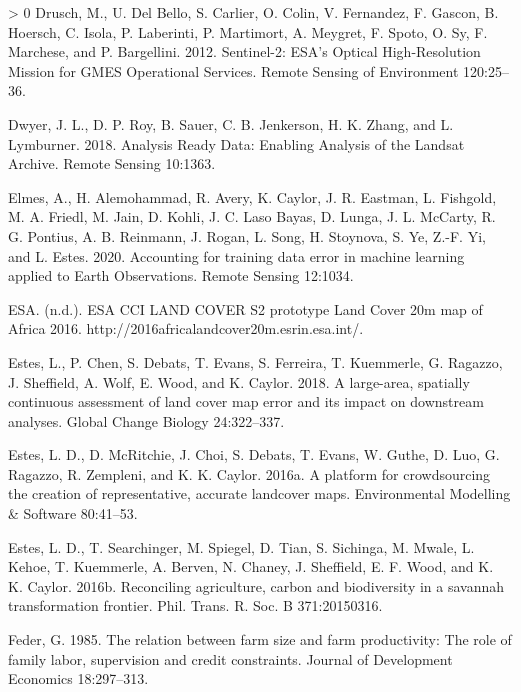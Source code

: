 \documentclass[11pt,a4paper]{article}
\newlength{\cslhangindent}
\newenvironment{CSLReferences}[3] %
 {%
  \setlength{\parindent}{0pt}
  \ifodd #1 \everypar{\setlength{\hangindent}{\cslhangindent}}\ignorespaces\fi
  \ifnum #2 > 0
  \setlength{\parskip}{#2\baselineskip}
  \fi
 }%
 {}
\begin{document}
\begin{CSLReferences}{1}{0}
\leavevmode\hypertarget{ref-DruschSentinel2ESAOptical2012}{}%
Drusch, M., U. Del Bello, S. Carlier, O. Colin, V. Fernandez, F. Gascon,
B. Hoersch, C. Isola, P. Laberinti, P. Martimort, A. Meygret, F. Spoto,
O. Sy, F. Marchese, and P. Bargellini. 2012. Sentinel-2: {ESA}'s
{Optical High}-{Resolution Mission} for {GMES Operational Services}.
Remote Sensing of Environment 120:25--36.

\leavevmode\hypertarget{ref-DwyerAnalysisReadyData2018}{}%
Dwyer, J. L., D. P. Roy, B. Sauer, C. B. Jenkerson, H. K. Zhang, and L.
Lymburner. 2018. Analysis {Ready Data}: {Enabling Analysis} of the
{Landsat Archive}. Remote Sensing 10:1363.

\leavevmode\hypertarget{ref-ElmesAccountingtrainingdata2020}{}%
Elmes, A., H. Alemohammad, R. Avery, K. Caylor, J. R. Eastman, L.
Fishgold, M. A. Friedl, M. Jain, D. Kohli, J. C. Laso Bayas, D. Lunga,
J. L. McCarty, R. G. Pontius, A. B. Reinmann, J. Rogan, L. Song, H.
Stoynova, S. Ye, Z.-F. Yi, and L. Estes. 2020. Accounting for training
data error in machine learning applied to {Earth Observations}. Remote
Sensing 12:1034.

\leavevmode\hypertarget{ref-ESAESACCILAND}{}%
ESA. (n.d.). {ESA CCI LAND COVER} {} {S2} prototype {Land Cover} 20m map
of {Africa} 2016. http://2016africalandcover20m.esrin.esa.int/.

\leavevmode\hypertarget{ref-Esteslargeareaspatiallycontinuous2018}{}%
Estes, L., P. Chen, S. Debats, T. Evans, S. Ferreira, T. Kuemmerle, G.
Ragazzo, J. Sheffield, A. Wolf, E. Wood, and K. Caylor. 2018. A
large-area, spatially continuous assessment of land cover map error and
its impact on downstream analyses. Global Change Biology 24:322--337.

\leavevmode\hypertarget{ref-Estesplatformcrowdsourcingcreation2016}{}%
Estes, L. D., D. McRitchie, J. Choi, S. Debats, T. Evans, W. Guthe, D.
Luo, G. Ragazzo, R. Zempleni, and K. K. Caylor. 2016a. A platform for
crowdsourcing the creation of representative, accurate landcover maps.
Environmental Modelling \& Software 80:41--53.

\leavevmode\hypertarget{ref-EstesReconcilingagriculturecarbon2016}{}%
Estes, L. D., T. Searchinger, M. Spiegel, D. Tian, S. Sichinga, M.
Mwale, L. Kehoe, T. Kuemmerle, A. Berven, N. Chaney, J. Sheffield, E. F.
Wood, and K. K. Caylor. 2016b. Reconciling agriculture, carbon and
biodiversity in a savannah transformation frontier. Phil. Trans. R. Soc.
B 371:20150316.

\leavevmode\hypertarget{ref-federRelationFarmSize1985}{}%
Feder, G. 1985. The relation between farm size and farm productivity:
{The} role of family labor, supervision and credit constraints. Journal
of Development Economics 18:297--313.


\end{CSLReferences}
\end{document}
